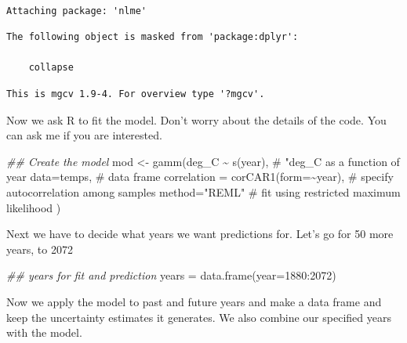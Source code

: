 \documentclass[
  letterpaper,
  DIV=11,
  numbers=noendperiod]{scrreprt}
\newenvironment{Shaded}{\begin{snugshade}}{\end{snugshade}}
\newcommand{\AttributeTok}[1]{\textcolor[rgb]{0.40,0.45,0.13}{#1}}
\newcommand{\CommentTok}[1]{\textcolor[rgb]{0.37,0.37,0.37}{#1}}
\newcommand{\DecValTok}[1]{\textcolor[rgb]{0.68,0.00,0.00}{#1}}
\newcommand{\DocumentationTok}[1]{\textcolor[rgb]{0.37,0.37,0.37}{\textit{#1}}}
\newcommand{\FunctionTok}[1]{\textcolor[rgb]{0.28,0.35,0.67}{#1}}
\newcommand{\NormalTok}[1]{\textcolor[rgb]{0.00,0.23,0.31}{#1}}
\newcommand{\OtherTok}[1]{\textcolor[rgb]{0.00,0.23,0.31}{#1}}
\newcommand{\SpecialCharTok}[1]{\textcolor[rgb]{0.37,0.37,0.37}{#1}}
\newcommand{\StringTok}[1]{\textcolor[rgb]{0.13,0.47,0.30}{#1}}
\begin{document}
\begin{verbatim}

Attaching package: 'nlme'
\end{verbatim}

\begin{verbatim}
The following object is masked from 'package:dplyr':

    collapse
\end{verbatim}

\begin{verbatim}
This is mgcv 1.9-4. For overview type '?mgcv'.
\end{verbatim}

Now we ask R to fit the model. Don't worry about the details of the
code. You can ask me if you are interested.

\begin{Shaded}
\begin{Highlighting}[]
\DocumentationTok{\#\# Create the model}
\NormalTok{mod }\OtherTok{\textless{}{-}} \FunctionTok{gamm}\NormalTok{(deg\_C }\SpecialCharTok{\textasciitilde{}} \FunctionTok{s}\NormalTok{(year),  }\CommentTok{\# "deg\_C as a function of year}
            \AttributeTok{data=}\NormalTok{temps, }\CommentTok{\# data frame}
          \AttributeTok{correlation =} \FunctionTok{corCAR1}\NormalTok{(}\AttributeTok{form=}\SpecialCharTok{\textasciitilde{}}\NormalTok{year), }\CommentTok{\# specify autocorrelation among samples}
          \AttributeTok{method=}\StringTok{"REML"} \CommentTok{\# fit using restricted maximum likelihood}
\NormalTok{          )}
\end{Highlighting}
\end{Shaded}

Next we have to decide what years we want predictions for. Let's go for
50 more years, to 2072

\begin{Shaded}
\begin{Highlighting}[]
\DocumentationTok{\#\# years for fit and prediction}
\NormalTok{years }\OtherTok{=} \FunctionTok{data.frame}\NormalTok{(}\AttributeTok{year=}\DecValTok{1880}\SpecialCharTok{:}\DecValTok{2072}\NormalTok{)}
\end{Highlighting}
\end{Shaded}

Now we apply the model to past and future years and make a data frame
and keep the uncertainty estimates it generates. We also combine our
specified years with the model.
\end{document}
